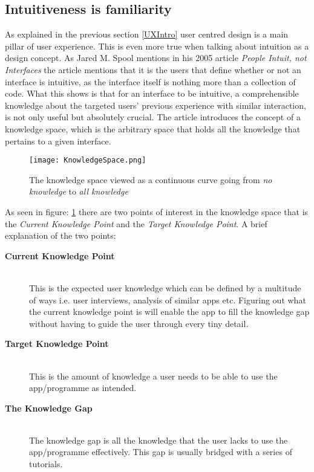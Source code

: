 \subsection{Intuitiveness is familiarity} \label{IntuIsFam}
As explained in the previous section \ref{UXIntro} user centred design is a main 
pillar of user experience. This is even more true when talking about intuition as 
a design concept. As Jared M. Spool mentions in his 2005 article \textit{People 
Intuit, not Interfaces}\cite{JaredMSpool} the article mentions that it is the 
users that define whether or not an interface is intuitive, as the interface 
itself is nothing more than a collection of code. What this shows is that for an 
interface to be intuitive, a comprehensible knowledge about the targeted users' 
previous experience with similar interaction, is not only useful but absolutely 
crucial. The article introduces the concept of a knowledge space, which is the 
arbitrary space that holds all the knowledge that pertains to a given interface. 

\begin{figure}[H]
\centering
\texttt{[image: KnowledgeSpace.png]}
\caption{The knowledge space viewed as a continuous curve going from \textit{no 
knowledge} to \textit{all knowledge} \cite{JaredMSpool}}
\label{fig:Knowledge}
\end{figure}

As seen in figure: \ref{fig:Knowledge} there are two points of interest in the 
knowledge space that is the \textit{Current Knowledge Point} and the 
\textit{Target Knowledge Point}. A brief explanation of the two points:
\begin{description}
 \item[\textbf{Current Knowledge Point}] \hfill\\
This is the expected user knowledge which can be defined by a multitude of ways i.e. user interviews, analysis of similar apps etc. Figuring out what the 
current knowledge point is will enable the app to fill the knowledge gap without 
having to guide the user through every tiny detail. 
\item[\textbf{Target Knowledge Point}]\hfill\\
This is the amount of knowledge a user needs to be able to use the app/programme
as intended.
\item[\textbf{The Knowledge Gap}]\hfill\\
The knowledge gap is all the knowledge that the user lacks to use the app/programme effectively. This gap is usually bridged with a series of tutorials. 
\end{description}

